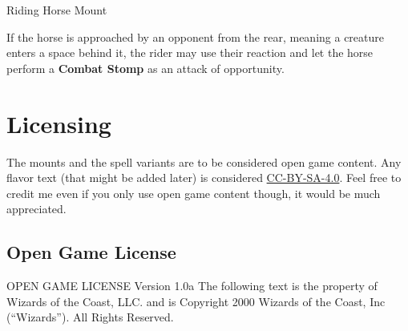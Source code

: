 \documentclass[letterpaper,twocolumn,openany,nodeprecatedcode]{dndbook}
\begin{document}
\begin{DndMonster}[float*=b,width=\textwidth + 8pt]{Riding Horse Mount}
\begin{multicols}{2}

    If the horse is approached by an opponent from the rear, meaning a creature enters a space behind it, the rider may use their reaction and let the horse perform a \textbf{Combat Stomp} as an attack of opportunity.

  \end{multicols}
\end{DndMonster}

\chapter{Licensing}

The mounts and the spell variants are to be considered open game content. Any flavor text (that might be added later) is considered \href{https://creativecommons.org/licenses/by-sa/4.0/legalcode}{CC-BY-SA-4.0}. Feel free to credit me even if you only use open game content though, it would be much appreciated.

\section{Open Game License}

OPEN GAME LICENSE Version 1.0a The following text is the property of Wizards of the Coast, LLC. and is Copyright 2000 Wizards of the Coast, Inc (“Wizards”). All Rights Reserved.
\end{document}
